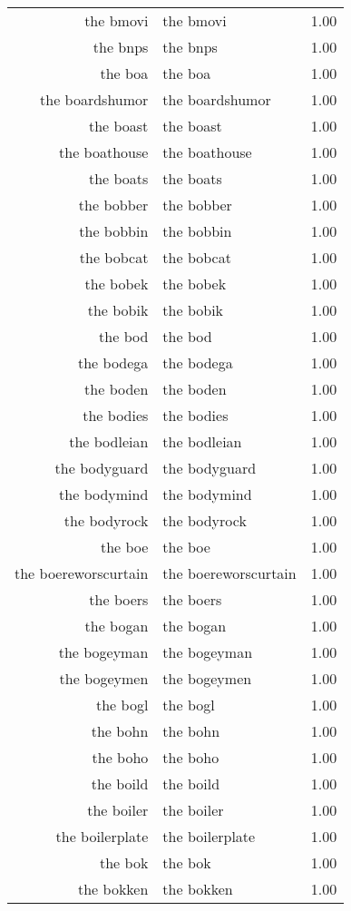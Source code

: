 \begin{table}[ht]
\begin{tabular}{rlr}
  the bmovi & the bmovi & 1.00 \\ 
  the bnps & the bnps & 1.00 \\ 
  the boa & the boa & 1.00 \\ 
  the boardshumor & the boardshumor & 1.00 \\ 
  the boast & the boast & 1.00 \\ 
  the boathouse & the boathouse & 1.00 \\ 
  the boats & the boats & 1.00 \\ 
  the bobber & the bobber & 1.00 \\ 
  the bobbin & the bobbin & 1.00 \\ 
  the bobcat & the bobcat & 1.00 \\ 
  the bobek & the bobek & 1.00 \\ 
  the bobik & the bobik & 1.00 \\ 
  the bod & the bod & 1.00 \\ 
  the bodega & the bodega & 1.00 \\ 
  the boden & the boden & 1.00 \\ 
  the bodies & the bodies & 1.00 \\ 
  the bodleian & the bodleian & 1.00 \\ 
  the bodyguard & the bodyguard & 1.00 \\ 
  the bodymind & the bodymind & 1.00 \\ 
  the bodyrock & the bodyrock & 1.00 \\ 
  the boe & the boe & 1.00 \\ 
  the boereworscurtain & the boereworscurtain & 1.00 \\ 
  the boers & the boers & 1.00 \\ 
  the bogan & the bogan & 1.00 \\ 
  the bogeyman & the bogeyman & 1.00 \\ 
  the bogeymen & the bogeymen & 1.00 \\ 
  the bogl & the bogl & 1.00 \\ 
  the bohn & the bohn & 1.00 \\ 
  the boho & the boho & 1.00 \\ 
  the boild & the boild & 1.00 \\ 
  the boiler & the boiler & 1.00 \\ 
  the boilerplate & the boilerplate & 1.00 \\ 
  the bok & the bok & 1.00 \\ 
  the bokken & the bokken & 1.00 \\ 

\end{tabular}
\end{table}
